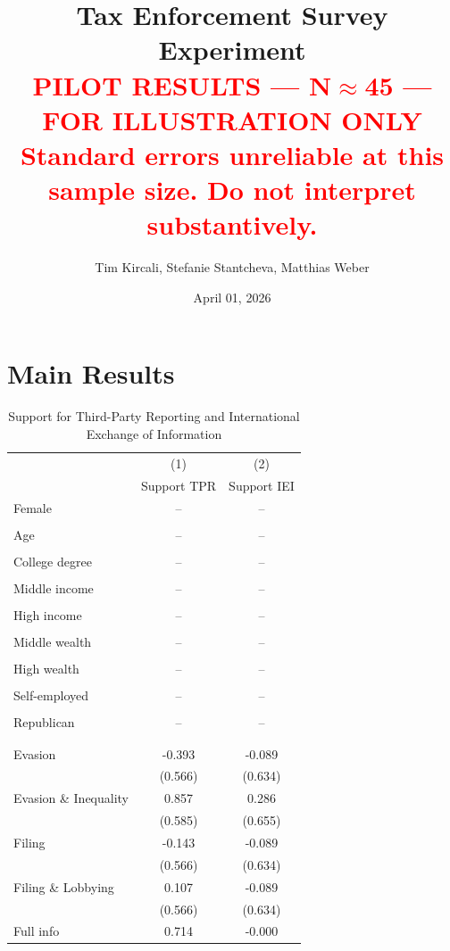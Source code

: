 \documentclass[11pt]{article}
\title{Tax Enforcement Survey Experiment\\
\large \textcolor{red}{PILOT RESULTS --- N$\approx$45 --- FOR ILLUSTRATION ONLY}\\
\large \textcolor{red}{Standard errors unreliable at this sample size. Do not interpret substantively.}}
\author{Tim Kircali, Stefanie Stantcheva, Matthias Weber}
\date{April 01, 2026}
\begin{document}
\maketitle
\tableofcontents
\newpage

\section{Main Results}

\begin{table}[!htbp]\centering
\caption{Support for Third-Party Reporting and International Exchange of Information}
\label{tab:supportTPRIEI_noc}
\begin{threeparttable}
\footnotesize
\begin{tabular}{l|cc}
\toprule
& (1) & (2) \\
& Support TPR & Support IEI \\
\midrule
Female & -- & -- \\
 &  &  \\
Age & -- & -- \\
 &  &  \\
College degree & -- & -- \\
 &  &  \\
Middle income & -- & -- \\
 &  &  \\
High income & -- & -- \\
 &  &  \\
Middle wealth & -- & -- \\
 &  &  \\
High wealth & -- & -- \\
 &  &  \\
Self-employed & -- & -- \\
 &  &  \\
Republican & -- & -- \\
 &  &  \\
\\[0.5em]
Evasion & -0.393 & -0.089 \\
 & (0.566) & (0.634) \\
Evasion \& Inequality & 0.857 & 0.286 \\
 & (0.585) & (0.655) \\
Filing & -0.143 & -0.089 \\
 & (0.566) & (0.634) \\
Filing \& Lobbying & 0.107 & -0.089 \\
 & (0.566) & (0.634) \\
Full info & 0.714 & -0.000 \\

\end{tabular}
\end{threeparttable}
\end{table}
\end{document}
